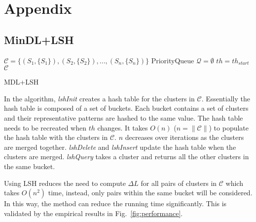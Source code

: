 \section{Appendix}

\subsection{MinDL+LSH}

 
\begin{algorithm}
	$\mathscr{C}=\{(S_1,\{S_1\}),(S_2,\{S_2\}),...,(S_n,\{S_n\})\}$\;
	PriorityQueue $\mathscr{Q}=\emptyset$\;
	$th=th_{start}$\;
	\Return $\mathscr{C}$
	\caption{MDL+LSH}
\end{algorithm}

In the algorithm, \textit{lshInit} creates a hash table for the clusters in $\mathscr{C}$. Essentially the hash table is composed of a set of buckets. Each bucket contains a set of clusters and their representative patterns are hashed to the same value. The hash table needs to be recreated when $th$ changes. It takes $O(n)$ ($n=\|\mathscr{C}\|$) to populate the hash table with the clusters in $\mathscr{C}$. $n$ decreases over iterations as the clusters are merged together. \textit{lshDelete} and \textit{lshInsert} update the hash table when the clusters are merged. \textit{lshQuery} takes a cluster and returns all the other clusters in the same bucket.

Using LSH reduces the need to compute $\Delta L$ for all pairs of clusters in $\mathscr{C}$ which takes $O(n^2)$ time, instead, only pairs within the same bucket will be considered. In this way, the method can reduce the running time significantly. This is validated by the empirical results in Fig.~\ref{fig:performance}.

